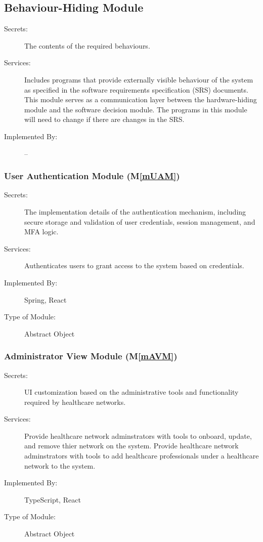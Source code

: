 \documentclass[12pt, titlepage]{article}
\newcommand{\mref}[1]{M\ref{#1}}
\begin{document}
\subsection{Behaviour-Hiding Module}

\begin{description}
\item[Secrets:]The contents of the required behaviours.
\item[Services:]Includes programs that provide externally visible behaviour of the system as specified in the software requirements specification (SRS) documents. This module serves as a communication layer between the hardware-hiding module and the software decision module. The programs in this module will need to change if there are changes in the SRS.
\item[Implemented By:] --
\end{description}

\subsubsection{User Authentication Module (\mref{mUAM})} 

\begin{description}
\item[Secrets:]The implementation details of the authentication mechanism, including secure storage and validation of user credentials, session management, and MFA logic.
\item[Services:]Authenticates users to grant access to the system based on credentials.
\item[Implemented By:]Spring, React
\item[Type of Module:]Abstract Object
\end{description}

\subsubsection{Administrator View Module (\mref{mAVM})}

\begin{description}
\item[Secrets:]UI customization based on the administrative tools and functionality required by healthcare networks.
\item[Services:]Provide healthcare network adminstrators with tools to onboard, update, and remove thier network on the system. Provide healthcare network adminstrators with tools to add healthcare professionals under a healthcare network to the system.
\item[Implemented By:]TypeScript, React
\item[Type of Module:]Abstract Object
\end{description}
\end{document}
